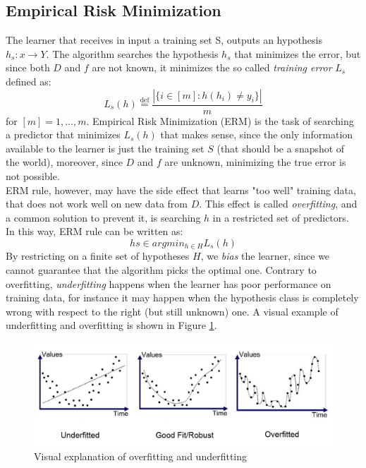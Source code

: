 \subsection{Empirical Risk Minimization}
The learner that receives in input a training set S, outputs an hypothesis $h_s : x \rightarrow Y$. The algorithm searches the hypothesis $h_s$ that minimizes the error, but since both $D$ and $f$ are not known, it minimizes the so called \textit{training error} $L_s$ defined as:
\[ L_s(h) \stackrel{\text{def}}{=} \frac{|\{i \in [m] : h(h_i) \neq y_i\}|}{m} \]
for $[m] = {1, \dots, m}$. Empirical Risk Minimization (ERM) is the task of searching a predictor that minimizes $L_s(h)$ that makes sense, since the only information available to the learner is just the training set $S$ (that should be a snapshot of the world), moreover, since $D$ and $f$ are unknown, minimizing the true error is not possible.\\
ERM rule, however, may have the side effect that learns "too well" training data, that does not work well on new data from $D$. This effect is called \textit{overfitting}, and a common solution to prevent it, is searching $h$ in a restricted set of predictors. In this way, ERM rule can be written as:
\[hs \in argmin_{h \in H} L_s(h)\]
By restricting on a finite set of hypotheses $H$, we \textit{bias} the learner, since we cannot guarantee that the algorithm picks the optimal one. Contrary to overfitting, \textit{underfitting} happens when the learner has poor performance on training data, for instance it may happen when the hypothesis class is completely wrong with respect to the right (but still unknown) one. A visual example of underfitting and overfitting is shown in Figure \ref{fig:overfit-underfit}.

\begin{figure}
	\centering
	\includegraphics[width=1\textwidth]{figures/overfit-underfit.png}
	\caption{Visual explanation of overfitting and underfitting}
	\label{fig:overfit-underfit}
\end{figure}



